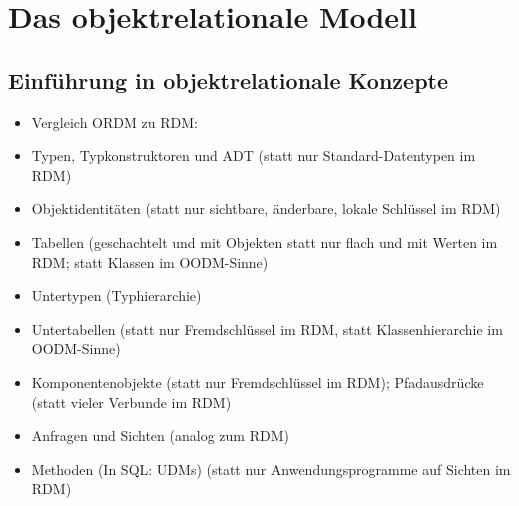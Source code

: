 \section{Das objektrelationale Modell}
\subsection{Einführung in objektrelationale Konzepte}
\begin{itemize}
	\item Vergleich ORDM zu RDM:
	\item Typen, Typkonstruktoren und ADT (statt nur Standard-Datentypen im RDM)
	\item Objektidentitäten (statt nur sichtbare, änderbare, lokale Schlüssel im RDM)
	\item Tabellen (geschachtelt und mit Objekten statt nur flach und mit Werten im RDM; statt Klassen im OODM-Sinne)
	\item Untertypen (Typhierarchie)
	\item Untertabellen (statt nur Fremdschlüssel im RDM, statt Klassenhierarchie im OODM-Sinne)
	\item Komponentenobjekte (statt nur Fremdschlüssel im RDM); Pfadausdrücke (statt vieler Verbunde im RDM)
	\item Anfragen und Sichten (analog zum RDM)
	\item Methoden (In SQL: UDMs) (statt nur Anwendungsprogramme auf Sichten im RDM)
\end{itemize}

